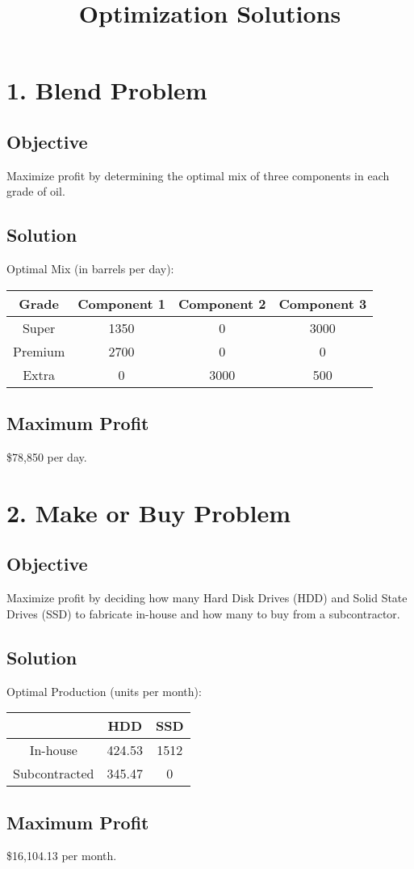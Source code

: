\documentclass{article}
\title{Optimization Solutions}
\date{}
\begin{document}
\maketitle

\section*{1. Blend Problem}

\subsection*{Objective}
Maximize profit by determining the optimal mix of three components in each grade of oil.

\subsection*{Solution}
Optimal Mix (in barrels per day):

\begin{tabular}{|c|c|c|c|}
\hline
Grade & Component 1 & Component 2 & Component 3 \\
\hline
Super & 1350 & 0 & 3000 \\
Premium & 2700 & 0 & 0 \\
Extra & 0 & 3000 & 500 \\
\hline
\end{tabular}

\subsection*{Maximum Profit}
\$78,850 per day.

\section*{2. Make or Buy Problem}

\subsection*{Objective}
Maximize profit by deciding how many Hard Disk Drives (HDD) and Solid State Drives (SSD) to fabricate in-house and how many to buy from a subcontractor.

\subsection*{Solution}
Optimal Production (units per month):

\begin{tabular}{|c|c|c|}
\hline
 & HDD & SSD \\
\hline
In-house & 424.53 & 1512 \\
Subcontracted & 345.47 & 0 \\
\hline
\end{tabular}

\subsection*{Maximum Profit}
\$16,104.13 per month.
\end{document}
